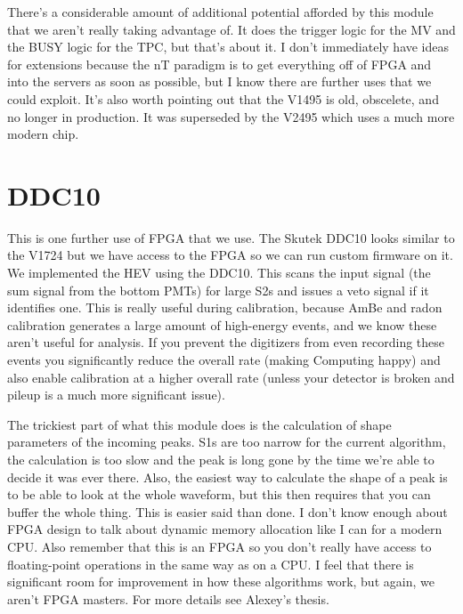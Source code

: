 There's a considerable amount of additional potential afforded by this module that we aren't really taking advantage of.
It does the trigger logic for the MV and the BUSY logic for the TPC, but that's about it.
I don't immediately have ideas for extensions because the nT paradigm is to get everything off of FPGA and into the servers as soon as possible, but I know there are further uses that we could exploit.
It's also worth pointing out that the V1495 is old, obscelete, and no longer in production.
It was superseded by the V2495 which uses a much more modern chip.

\section{DDC10}

This is one further use of FPGA that we use.
The Skutek DDC10 looks similar to the V1724 but we have access to the FPGA so we can run custom firmware on it.
We implemented the HEV using the DDC10.
This scans the input signal (the sum signal from the bottom PMTs) for large S2s and issues a veto signal if it identifies one.
This is really useful during calibration, because AmBe and radon calibration generates a large amount of high-energy events, and we know these aren't useful for analysis.
If you prevent the digitizers from even recording these events you significantly reduce the overall rate (making Computing happy) and also enable calibration at a higher overall rate (unless your detector is broken and pileup is a much more significant issue).

The trickiest part of what this module does is the calculation of shape parameters of the incoming peaks.
S1s are too narrow for the current algorithm, the calculation is too slow and the peak is long gone by the time we're able to decide it was ever there.
Also, the easiest way to calculate the shape of a peak is to be able to look at the whole waveform, but this then requires that you can buffer the whole thing.
This is easier said than done.
I don't know enough about FPGA design to talk about dynamic memory allocation like I can for a modern CPU.
Also remember that this is an FPGA so you don't really have access to floating-point operations in the same way as on a CPU.
I feel that there is significant room for improvement in how these algorithms work, but again, we aren't FPGA masters.
For more details see Alexey's thesis.
